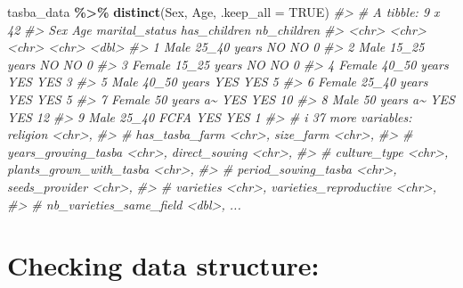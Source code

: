 \documentclass[
]{book}
\newenvironment{Shaded}{\begin{snugshade}}{\end{snugshade}}
\newcommand{\AttributeTok}[1]{\textcolor[rgb]{0.13,0.29,0.53}{#1}}
\newcommand{\CommentTok}[1]{\textcolor[rgb]{0.56,0.35,0.01}{\textit{#1}}}
\newcommand{\ConstantTok}[1]{\textcolor[rgb]{0.56,0.35,0.01}{#1}}
\newcommand{\FunctionTok}[1]{\textcolor[rgb]{0.13,0.29,0.53}{\textbf{#1}}}
\newcommand{\NormalTok}[1]{#1}
\newcommand{\SpecialCharTok}[1]{\textcolor[rgb]{0.81,0.36,0.00}{\textbf{#1}}}
\begin{document}
\begin{Shaded}
\begin{Highlighting}[]
\NormalTok{tasba\_data }\SpecialCharTok{\%\textgreater{}\%} \FunctionTok{distinct}\NormalTok{(Sex, Age, }\AttributeTok{.keep\_all =} \ConstantTok{TRUE}\NormalTok{)}
\CommentTok{\#\textgreater{} \# A tibble: 9 x 42}
\CommentTok{\#\textgreater{}   Sex    Age         marital\_status has\_children nb\_children}
\CommentTok{\#\textgreater{}   \textless{}chr\textgreater{}  \textless{}chr\textgreater{}       \textless{}chr\textgreater{}          \textless{}chr\textgreater{}              \textless{}dbl\textgreater{}}
\CommentTok{\#\textgreater{} 1 Male   25\_40 years NO             NO                     0}
\CommentTok{\#\textgreater{} 2 Male   15\_25 years NO             NO                     0}
\CommentTok{\#\textgreater{} 3 Female 15\_25 years NO             NO                     0}
\CommentTok{\#\textgreater{} 4 Female 40\_50 years YES            YES                    3}
\CommentTok{\#\textgreater{} 5 Male   40\_50 years YES            YES                    5}
\CommentTok{\#\textgreater{} 6 Female 25\_40 years YES            YES                    5}
\CommentTok{\#\textgreater{} 7 Female 50 years a\textasciitilde{} YES            YES                   10}
\CommentTok{\#\textgreater{} 8 Male   50 years a\textasciitilde{} YES            YES                   12}
\CommentTok{\#\textgreater{} 9 Male   25\_40 FCFA  YES            YES                    1}
\CommentTok{\#\textgreater{} \# i 37 more variables: religion \textless{}chr\textgreater{},}
\CommentTok{\#\textgreater{} \#   has\_tasba\_farm \textless{}chr\textgreater{}, size\_farm \textless{}chr\textgreater{},}
\CommentTok{\#\textgreater{} \#   years\_growing\_tasba \textless{}chr\textgreater{}, direct\_sowing \textless{}chr\textgreater{},}
\CommentTok{\#\textgreater{} \#   culture\_type \textless{}chr\textgreater{}, plants\_grown\_with\_tasba \textless{}chr\textgreater{},}
\CommentTok{\#\textgreater{} \#   period\_sowing\_tasba \textless{}chr\textgreater{}, seeds\_provider \textless{}chr\textgreater{},}
\CommentTok{\#\textgreater{} \#   varieties \textless{}chr\textgreater{}, varieties\_reproductive \textless{}chr\textgreater{},}
\CommentTok{\#\textgreater{} \#   nb\_varieties\_same\_field \textless{}dbl\textgreater{}, ...}
\end{Highlighting}
\end{Shaded}

\hypertarget{checking-data-structure}{%
\section{Checking data structure:}\label{checking-data-structure}}
\end{document}
